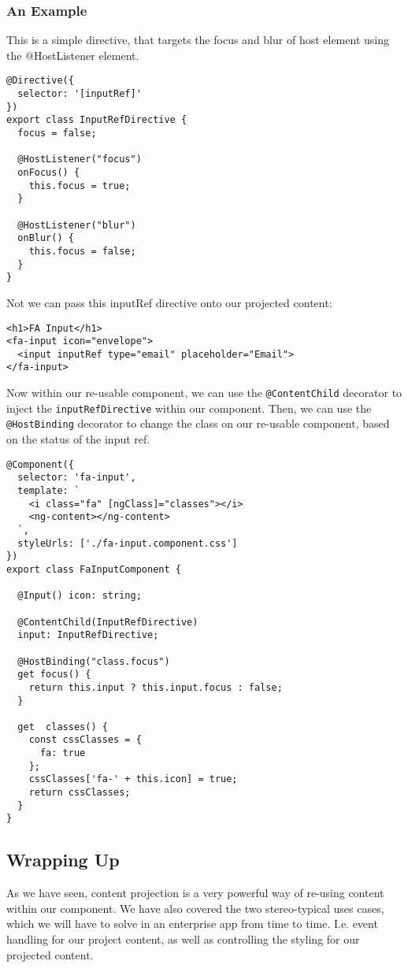 \subsubsection{ An Example }
This is a simple directive, that targets the focus and blur of host element
using the @HostListener element.

\begin{lstlisting}
@Directive({
  selector: '[inputRef]'
})
export class InputRefDirective {
  focus = false;

  @HostListener("focus")
  onFocus() {
    this.focus = true;
  }

  @HostListener("blur")
  onBlur() {
    this.focus = false;
  }
}
\end{lstlisting}

Not we can pass this inputRef directive onto our projected content:
\begin{lstlisting}
<h1>FA Input</h1>
<fa-input icon="envelope">
  <input inputRef type="email" placeholder="Email">
</fa-input>
\end{lstlisting}

Now within our re-usable component, we can use the \lstinline{@ContentChild}
decorator to inject the \lstinline{inputRefDirective} within our component. Then,
we can use the \lstinline{@HostBinding} decorator to change the class on our
re-usable component, based on the status of the input ref.
\begin{lstlisting}
@Component({
  selector: 'fa-input',
  template: `
    <i class="fa" [ngClass]="classes"></i>
    <ng-content></ng-content>
  `,
  styleUrls: ['./fa-input.component.css']
})
export class FaInputComponent {

  @Input() icon: string;

  @ContentChild(InputRefDirective)
  input: InputRefDirective;

  @HostBinding("class.focus")
  get focus() {
    return this.input ? this.input.focus : false;
  }

  get  classes() {
    const cssClasses = {
      fa: true
    };
    cssClasses['fa-' + this.icon] = true;
    return cssClasses;
  }
}
\end{lstlisting}

\subsection{ Wrapping Up }
As we have seen, content projection is a very powerful way of re-using content
within our component. We have also covered the two stereo-typical uses cases,
which we will have to solve in an enterprise app from time to time. I.e. event
handling for our project content, as well as controlling the styling for our
projected content.
